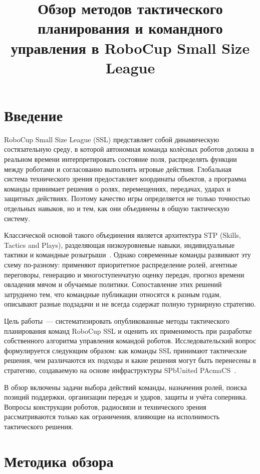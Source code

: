 \documentclass{misisarticle}
\title{Обзор методов тактического планирования и командного управления в RoboCup Small Size League}
\begin{document}
\maketitle

\section{Введение}

RoboCup Small Size League (SSL) представляет собой динамическую состязательную среду, в которой автономная команда колёсных роботов должна в реальном времени интерпретировать состояние поля, распределять функции между роботами и согласованно выполнять игровые действия. Глобальная система технического зрения предоставляет координаты объектов, а программа команды принимает решения о ролях, перемещениях, передачах, ударах и защитных действиях. Поэтому качество игры определяется не только точностью отдельных навыков, но и тем, как они объединены в общую тактическую систему.

Классической основой такого объединения является архитектура STP (Skills, Tactics and Plays), разделяющая низкоуровневые навыки, индивидуальные тактики и командные розыгрыши~\cite{stp2005}. Однако современные команды развивают эту схему по-разному: применяют приоритетное распределение ролей, агентные переговоры, генерацию и многоступенчатую оценку передач, прогноз времени овладения мячом и обучаемые политики. Сопоставление этих решений затруднено тем, что командные публикации относятся к разным годам, описывают разные подзадачи и не всегда содержат полную турнирную стратегию.

Цель работы~--- систематизировать опубликованные методы тактического планирования команд RoboCup SSL и оценить их применимость при разработке собственного алгоритма управления командой роботов. Исследовательский вопрос формулируется следующим образом: как команды SSL принимают тактические решения, чем различаются их подходы и какие решения могут быть перенесены в стратегию, создаваемую на основе инфраструктуры SPbUnited PAcmaCS~\cite{pacmacs}.

В обзор включены задачи выбора действий команды, назначения ролей, поиска позиций поддержки, организации передач и ударов, защиты и учёта соперника. Вопросы конструкции роботов, радиосвязи и технического зрения рассматриваются только как ограничения, влияющие на исполнимость тактического решения.

\section{Методика обзора}
\end{document}
